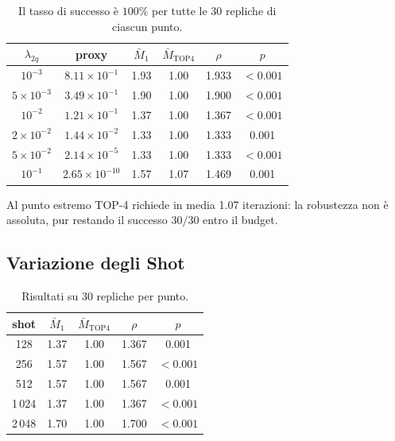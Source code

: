 \begin{onehalfspace}
\begin{table}[H]
\centering
\caption[Sweep del parametro Aer $\lambda_{2q}$]{Il tasso di successo è
$100\%$ per tutte le 30 repliche di ciascun punto.}
\label{tab:sweep_eps}
\label{tab:sweep_eps2q}
\begin{tabular}{cccccc}
\toprule
$\lambda_{2q}$ & proxy & $\bar M_1$ & $\bar M_{\mathrm{TOP4}}$ & $\rho$ & $p$ \\
\midrule
$10^{-3}$ & $8.11\times10^{-1}$ & 1.93 & 1.00 & 1.933 & $<0.001$ \\
$5\times10^{-3}$ & $3.49\times10^{-1}$ & 1.90 & 1.00 & 1.900 & $<0.001$ \\
$10^{-2}$ & $1.21\times10^{-1}$ & 1.37 & 1.00 & 1.367 & $<0.001$ \\
$2\times10^{-2}$ & $1.44\times10^{-2}$ & 1.33 & 1.00 & 1.333 & 0.001 \\
$5\times10^{-2}$ & $2.14\times10^{-5}$ & 1.33 & 1.00 & 1.333 & $<0.001$ \\
$10^{-1}$ & $2.65\times10^{-10}$ & 1.57 & 1.07 & 1.469 & 0.001 \\
\bottomrule
\end{tabular}
\end{table}

Al punto estremo TOP-4 richiede in media 1.07 iterazioni: la robustezza
non è assoluta, pur restando il successo $30/30$ entro il budget.

\subsection{Variazione degli Shot}
\label{subsec:sweep_shots}

\begin{table}[H]
\centering
\caption[Sweep degli shot]{Risultati su 30 repliche per punto.}
\label{tab:sweep_shots}
\begin{tabular}{ccccc}
\toprule
shot & $\bar M_1$ & $\bar M_{\mathrm{TOP4}}$ & $\rho$ & $p$ \\
\midrule
128  & 1.37 & 1.00 & 1.367 & 0.001 \\
256  & 1.57 & 1.00 & 1.567 & $<0.001$ \\
512  & 1.57 & 1.00 & 1.567 & 0.001 \\
1\,024 & 1.37 & 1.00 & 1.367 & $<0.001$ \\
2\,048 & 1.70 & 1.00 & 1.700 & $<0.001$ \\
\bottomrule
\end{tabular}
\end{table}


\end{onehalfspace}
